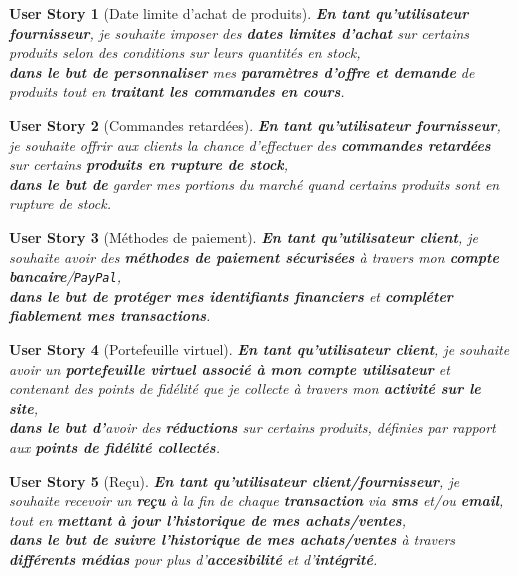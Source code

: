 \documentclass[a4paper,12pt]{book}
\theoremstyle{break}
\newtheorem*{userStory}{User Story}
\theoremstyle{break}
\theoremstyle{break}
\theoremstyle{break}
\theoremstyle{definition}
\theoremstyle{remark}
\begin{document}
\begin{userStory}[Date limite d'achat de produits]
\textbf{En tant qu'utilisateur {\color{red}fournisseur}}, je souhaite imposer des \textbf{dates limites d'achat} sur certains produits selon des conditions sur leurs quantités en stock,\\
\indent
\textbf{dans le but de personnaliser} mes \textbf{paramètres d'offre et demande} de produits tout en \textbf{traitant les commandes en cours}.
\end{userStory}

\begin{userStory}[Commandes retardées]
\textbf{En tant qu'utilisateur {\color{red}fournisseur}}, je souhaite offrir aux clients la chance d'effectuer des \textbf{commandes retardées} sur certains \textbf{produits en rupture de stock},\\
\indent
\textbf{dans le but de} garder mes portions du marché quand certains produits sont en rupture de stock.
\end{userStory}

\begin{userStory}[Méthodes de paiement]
\textbf{En tant qu'utilisateur {\color{green}client}}, je souhaite avoir des \textbf{méthodes de paiement sécurisées} à travers mon \textbf{compte bancaire}/\texttt{PayPal},\\
\indent
\textbf{dans le but de protéger mes identifiants financiers} et \textbf{compléter fiablement mes transactions}.
\end{userStory}

\begin{userStory}[Portefeuille virtuel]
\textbf{En tant qu'utilisateur {\color{green}client}}, je souhaite avoir un \textbf{portefeuille virtuel associé à mon compte utilisateur} et contenant des points de fidélité que je collecte à travers mon \textbf{activité sur le site},\\
\indent
\textbf{dans le but d'}avoir des \textbf{réductions} sur certains produits, définies par rapport aux \textbf{points de fidélité collectés}.
\end{userStory}

\begin{userStory}[Reçu]
\textbf{En tant qu'utilisateur {\color{green}client}/{\color{red}fournisseur}}, je souhaite recevoir un \textbf{reçu} à la fin de chaque \textbf{transaction} via \textbf{sms} et/ou \textbf{email}, tout en \textbf{mettant à jour l'historique de mes achats/ventes},\\
\indent
\textbf{dans le but de suivre l'historique de mes achats/ventes} à travers \textbf{différents médias} pour plus d'\textbf{accesibilité} et d'\textbf{intégrité}.
\end{userStory}
\end{document}
